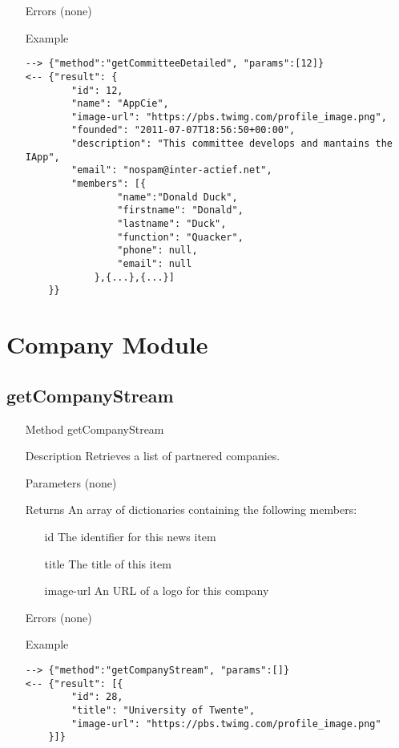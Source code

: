 \documentclass[a4paper]{scrreprt}
\begin{document}
\begin{enumerate}
\item[Errors] (none)
\item[Example]
\begin{lstlisting}
--> {"method":"getCommitteeDetailed", "params":[12]}
<-- {"result": {
        "id": 12,
        "name": "AppCie", 
        "image-url": "https://pbs.twimg.com/profile_image.png",
        "founded": "2011-07-07T18:56:50+00:00", 
        "description": "This committee develops and mantains the IApp", 
        "email": "nospam@inter-actief.net",
        "members": [{
            	"name":"Donald Duck",
                "firstname": "Donald",
                "lastname": "Duck",
                "function": "Quacker",
                "phone": null,
                "email": null
            },{...},{...}]
    }}
\end{lstlisting}
\end{enumerate}

\clearpage

\section{Company Module}
\subsection{getCompanyStream}
\begin{enumerate}
\item[Method] getCompanyStream
\item[Description] Retrieves a list of partnered companies.
\item[Parameters] (none)
\item[Returns] An array of dictionaries containing the following members:
\begin{enumerate}
    \item[id] The identifier for this news item
    \item[title] The title of this item
    \item[image-url] An URL of a logo for this company
	\end{enumerate}
\item[Errors] (none)
\item[Example]
\begin{lstlisting}
--> {"method":"getCompanyStream", "params":[]}
<-- {"result": [{
        "id": 28,
        "title": "University of Twente", 
        "image-url": "https://pbs.twimg.com/profile_image.png"
    }]}
\end{lstlisting}
\end{enumerate}
\end{document}
